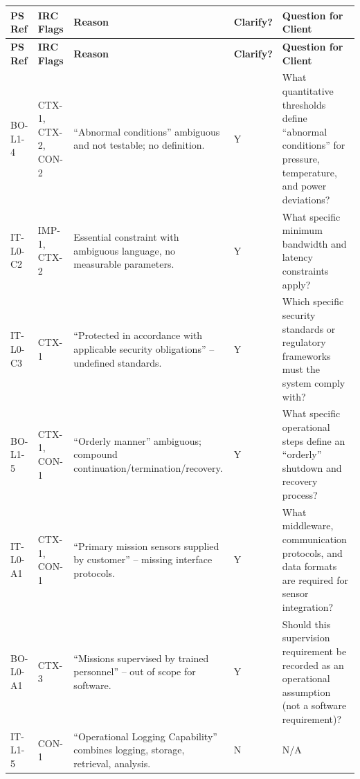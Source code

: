 \documentclass[11pt,a4paper]{article}
\begin{document}
\renewcommand{\arraystretch}{1.2}
\begin{longtable}{|p{}|p{}|p{}|p{}|p{}|}
\hline
\rowcolor{tableheader}
\textbf{PS Ref} & \textbf{IRC Flags} & \textbf{Reason} & \textbf{Clarify?} & \textbf{Question for Client} \\
\hline
\endfirsthead
\hline
\rowcolor{tableheader}
\textbf{PS Ref} & \textbf{IRC Flags} & \textbf{Reason} & \textbf{Clarify?} & \textbf{Question for Client} \\
\hline
\endhead

\rowcolor{flagrow}
BO-L1-4 & CTX-1, CTX-2, CON-2 & ``Abnormal conditions'' ambiguous and not testable; no definition. & Y & What quantitative thresholds define ``abnormal conditions'' for pressure, temperature, and power deviations? \\
\hline

\rowcolor{flagrow}
IT-L0-C2 & IMP-1, CTX-2 & Essential constraint with ambiguous language, no measurable parameters. & Y & What specific minimum bandwidth and latency constraints apply? \\
\hline

\rowcolor{flagrow}
IT-L0-C3 & CTX-1 & ``Protected in accordance with applicable security obligations'' -- undefined standards. & Y & Which specific security standards or regulatory frameworks must the system comply with? \\
\hline

\rowcolor{flagrow}
BO-L1-5 & CTX-1, CON-1 & ``Orderly manner'' ambiguous; compound continuation/termination/recovery. & Y & What specific operational steps define an ``orderly'' shutdown and recovery process? \\
\hline

\rowcolor{flagrow}
IT-L0-A1 & CTX-1, CON-1 & ``Primary mission sensors supplied by customer'' -- missing interface protocols. & Y & What middleware, communication protocols, and data formats are required for sensor integration? \\
\hline

\rowcolor{flagrow}
BO-L0-A1 & CTX-3 & ``Missions supervised by trained personnel'' -- out of scope for software. & Y & Should this supervision requirement be recorded as an operational assumption (not a software requirement)? \\
\hline

\rowcolor{flagrow}
IT-L1-5 & CON-1 & ``Operational Logging Capability'' combines logging, storage, retrieval, analysis. & N & N/A \\
\hline


\end{longtable}
\end{document}
